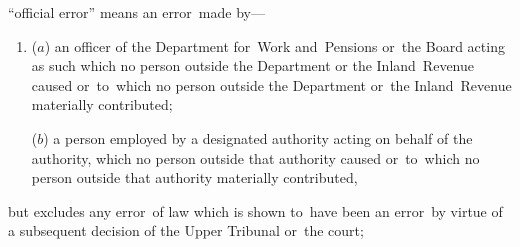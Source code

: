 \documentclass[12pt,a4paper]{article}
\begin{document}
\begin{enumerate}
    “official error” means an error~made by—
\begin{enumerate}\item[]
    ($a$) 
    an officer of the Department for~Work and~Pensions
 or~the Board acting as such which no person outside the Department
 or the Inland~Revenue caused or~to~which no person outside the Department
 or~the Inland~Revenue materially contributed;
 
   ($b$) 
    a person employed by a designated authority acting on behalf of the authority, which no person outside that authority caused or~to~which no person outside that authority materially contributed,
\end{enumerate}
    but excludes any error~of law which is shown to~have been an error~by virtue of a subsequent decision of 
the Upper Tribunal  %
or~the court;


%



\end{enumerate}
\end{document}
